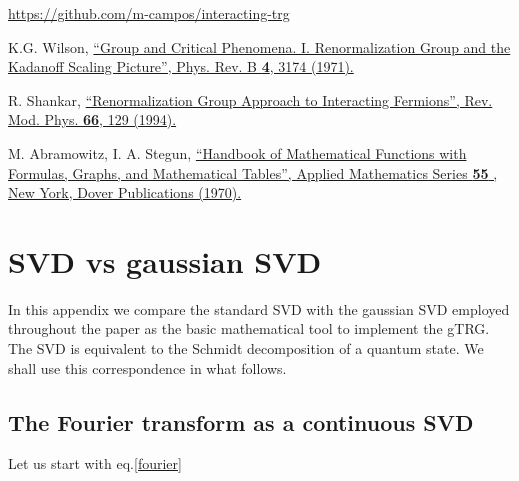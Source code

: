 \documentclass[a4paper,preprintnumbers,nofootinbib,twocolumn]{quantumarticle}
\begin{document}
\begin{thebibliography}{99}

\href{https://github.com/m-campos/interacting-trg}{https://github.com/m-campos/interacting-trg}




  K.G. Wilson, 
\href{https://doi.org/10.1103/PhysRevB.4.3174}{
``Group and Critical Phenomena. I. Renormalization Group and the Kadanoff Scaling Picture'',
Phys. Rev. B {\bf 4}, 3174 (1971).
}

 R. Shankar, 
\href{https://doi.org/10.1103/RevModPhys.66.129}{
``Renormalization Group Approach to Interacting Fermions'',
Rev. Mod. Phys. {\bf 66}, 129 (1994).
}

M. Abramowitz, I. A.  Stegun, 
\href{https://dl.acm.org/doi/10.5555/1098650}{
``Handbook of Mathematical Functions with Formulas, Graphs, and Mathematical Tables'',
Applied Mathematics Series {\bf 55} , New York,  Dover Publications (1970).
}




\end{thebibliography}


\onecolumngrid

\appendix

\section{SVD vs gaussian SVD}

In this appendix we compare the standard SVD with the gaussian SVD employed throughout the paper
as the basic mathematical  tool to implement the gTRG. The SVD is equivalent to the Schmidt
decomposition of a quantum state. We shall use this correspondence in what follows.


\subsection{The Fourier transform as a continuous SVD} 

Let us start with eq.\eqref{fourier}
 
\end{document}
